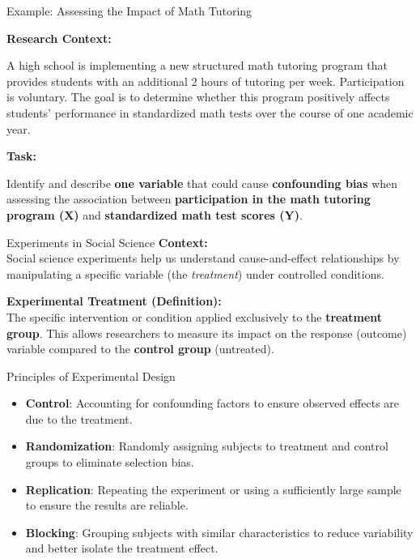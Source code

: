 \documentclass[handout]{beamer} %
\begin{document}
\begin{frame}{Example: Assessing the Impact of Math Tutoring}

    \textbf{Research Context:}

    A high school is implementing a new structured math tutoring program that provides students with an additional 2 hours of tutoring per week. Participation is voluntary. The goal is to determine whether this program positively affects students' performance in standardized math tests over the course of one academic year.

    \vspace{0.3cm}

    \textbf{Task:}

    Identify and describe \textbf{one variable} that could cause \textbf{confounding bias} when assessing the association between \textbf{participation in the math tutoring program (X)} and \textbf{standardized math test scores (Y)}.
\end{frame}

\begin{frame}{Experiments in Social Science}
    \textbf{Context:} \\
    Social science experiments help us understand cause-and-effect relationships by manipulating a specific variable (the \textit{treatment}) under controlled conditions. \pause %

    \vspace{0.3cm}

    \textbf{Experimental Treatment (Definition):}\\
    The specific intervention or condition applied exclusively to the \textbf{treatment group}. This allows researchers to measure its impact on the response (outcome) variable compared to the \textbf{control group} (untreated).

\end{frame}


\begin{frame}{Principles of Experimental Design}
    \begin{itemize}
        \item \textbf{Control}: Accounting for confounding factors to ensure observed effects are due to the treatment.
        \item \textbf{Randomization}: Randomly assigning subjects to treatment and control groups to eliminate selection bias. \pause %
        \item \textbf{Replication}: Repeating the experiment or using a sufficiently large sample to ensure the results are reliable.
        \item \textbf{Blocking}: Grouping subjects with similar characteristics to reduce variability and better isolate the treatment effect.
    \end{itemize}
\end{frame}
\end{document}
